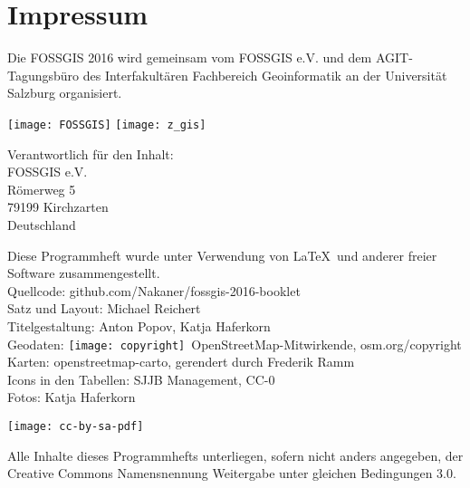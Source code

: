 \newpage
\section*{Impressum}
\label{impressum}


\RaggedRight
Die FOSSGIS 2016 wird gemeinsam vom FOSSGIS e.V. und dem AGIT-Tagungsbüro des Interfakultären Fachbereich Geoinformatik an der Universität Salzburg organisiert.

\vspace{0.5em}
	\texttt{[image: FOSSGIS]}
	\hfill
	\texttt{[image: z\_gis]}

\vspace{0.5em}
{\small\noindent Verantwortlich für den Inhalt:\\
FOSSGIS e.V.\\
Römerweg 5\\
79199 Kirchzarten\\
Deutschland

\vspace{0.5em}
\noindent Diese Programmheft wurde unter Verwendung von \LaTeX\ und 
anderer freier Software zusammengestellt.\\
 Quellcode: github.com/Nakaner/fossgis-2016-booklet\\
\noindent Satz und Layout: Michael Reichert\\
Titelgestaltung: Anton Popov, Katja Haferkorn\\
Geodaten: \texttt{[image: copyright]}~Open\-Street\-Map-Mitwirkende, osm.org/copyright\\
Karten: openstreetmap-carto, gerendert durch Frederik Ramm\\
Icons in den Tabellen: SJJB Management, CC-0\\
Fotos: Katja Haferkorn\\
}

\vspace{1em}
\noindent \begin{minipage}[htbp]{0.2\textwidth}
\noindent\texttt{[image: cc-by-sa-pdf]}
\end{minipage}
\hfill
\begin{minipage}[hbtp]{0.74\textwidth}\RaggedRight
Alle Inhalte dieses Programmhefts unterliegen, sofern nicht anders angegeben, 
der Creative Commons Namensnennung Weitergabe unter gleichen Bedingungen 3.0.
\end{minipage}


